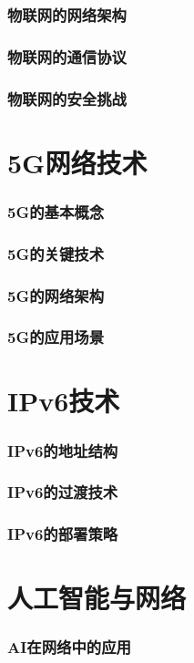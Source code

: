 \documentclass{book}
\begin{document}
\subsubsection{物联网的网络架构}
\subsubsection{物联网的通信协议}
\subsubsection{物联网的安全挑战}
\section{5G网络技术}
\subsubsection{5G的基本概念}
\subsubsection{5G的关键技术}
\subsubsection{5G的网络架构}
\subsubsection{5G的应用场景}
\section{IPv6技术}
\subsubsection{IPv6的地址结构}
\subsubsection{IPv6的过渡技术}
\subsubsection{IPv6的部署策略}
\section{人工智能与网络}
\subsubsection{AI在网络中的应用}
\end{document}
